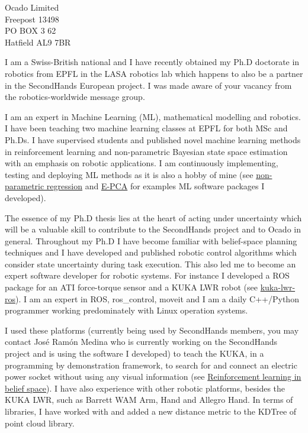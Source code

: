 \documentclass[11pt]{letter} %
\begin{document}
\begin{letter}{Ocado Limited\\ Freepost 13498\\ PO BOX 3 62\\ Hatfield AL9 7BR}



I am a Swiss-British national and I have recently obtained my Ph.D doctorate in robotics from
EPFL in the LASA robotics lab which happens to also be a partner in the SecondHands
European project. I was made aware of your vacancy from the robotics-worldwide message
group.


I am an expert in Machine Learning (ML), mathematical modelling and robotics. I have 
been teaching two  machine learning classes at EPFL for both MSc and Ph.Ds. I have supervised 
students and published novel machine learning methods in reinforcement learning and non-parametric Bayesian 
state space estimation with an emphasis on robotic applications. 
I am continuously implementing, testing and deploying ML methods as it is also a hobby of mine (see 
\href{http://chambrierg.com/projects/np_regression/}{non-parametric regression} and \href{http://chambrierg.com/projects/e-pca/}{E-PCA} 
for examples ML software packages I developed).

The essence of my Ph.D thesis lies at the heart of acting under uncertainty which will 
be a valuable skill to contribute to the SecondHands project and to Ocado in general. Throughout 
my Ph.D I have become familiar with belief-space planning techniques and I have developed and published robotic control 
algorithms which consider state uncertainty during task execution. This also led me to become an expert software developer 
for robotic systems. For instance I developed a ROS package for an ATI force-torque sensor and a KUKA LWR robot (see \href{https://github.com/epfl-lasa/kuka-lwr-ros}{kuka-lwr-ros}). 
I am an expert in ROS, ros\_control, moveit and I am a daily C++/Python programmer working predominately with Linux operation systems. 

I used these platforms (currently being used by SecondHands members, you may contact Jos\'{e} Ram\'{o}n Medina who is currently working on 
the SecondHands project and is using the software I developed) to teach the KUKA, in a programming by demonstration framework, to search for and 
connect an electric power socket without using any visual information (see \href{http://chambrierg.com/projects/rl_belief_space/}{Reinforcement learning in belief space}). 
I have also experience with other robotic platforms, besides the KUKA LWR, such as Barrett WAM Arm, Hand and Allegro Hand. In terms of libraries, I have worked with and added a new distance metric 
to the KDTree of point cloud library.  



\end{letter}
\end{document}
